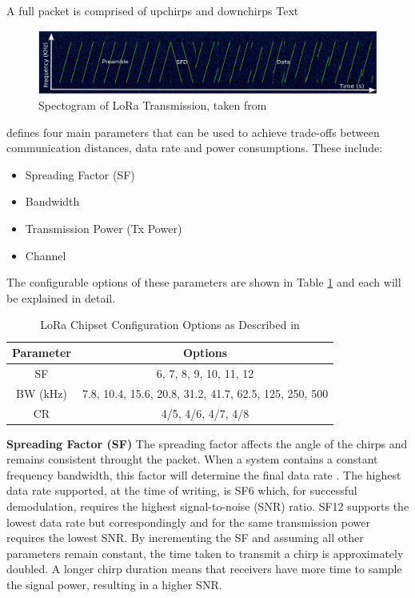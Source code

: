 \documentclass[a4paper,twoside,12pt]{report}
\begin{document}
A full packet is comprised of upchirps and downchirps \citep{Liando2019KnownStudy}
Text 

\begin{figure}[ht]
	\centering
	\includegraphics[width=0.8\linewidth]{images/LoRa transmission spectogram.png}
	\caption{Spectogram of LoRa Transmission, taken from \cite{Liando2019KnownStudy}}
	\label{fig:LoRaTransmissionSpectogram}
\end{figure}

\cite{Liando2019KnownStudy} defines four main parameters that can be used to achieve trade-offs between communication distances, data rate and power consumptions. These include:
\begin{itemize}
    \item Spreading Factor (SF)
    \item Bandwidth
    \item Transmission Power (Tx Power)
    \item Channel
\end{itemize}

The configurable options of these parameters are shown in Table \ref{tab:LoRaParams} and each will be explained in detail.
\begin{table}[!htbp]
	\centering
	\caption{LoRa Chipset Configuration Options as Described in \cite{SemtechDatasheet}}
	\label{tab:LoRaParams}
\begin{tabular}{cc}
	\hline
	Parameter & Options\\
	\hline\hline 
	SF & 6, 7, 8, 9, 10, 11, 12 \\ 
	BW (kHz) & 7.8, 10.4, 15.6, 20.8, 31.2, 41.7, 62.5, 125, 250, 500 \\ 
    CR & 4/5, 4/6, 4/7, 4/8 \\ 
	\hline
\end{tabular} 
\end{table}

\textbf{Spreading Factor (SF)} \newline
The spreading factor affects the angle of the chirps and remains consistent throught the packet. When a system contains a constant frequency bandwidth, this factor will determine the final data rate \citep{Liando2019KnownStudy}. The highest data rate supported, at the time of writing, is SF6 which, for successful demodulation, requires the highest signal-to-noise (SNR) ratio. SF12 supports the lowest data rate but correspondingly and for the same transmission power requires the lowest SNR. By incrementing the SF and assuming all other parameters remain constant, the time taken to transmit a chirp is approximately doubled. A longer chirp duration means that receivers have more time to sample the signal power, resulting in a higher SNR.
\newline
\end{document}
